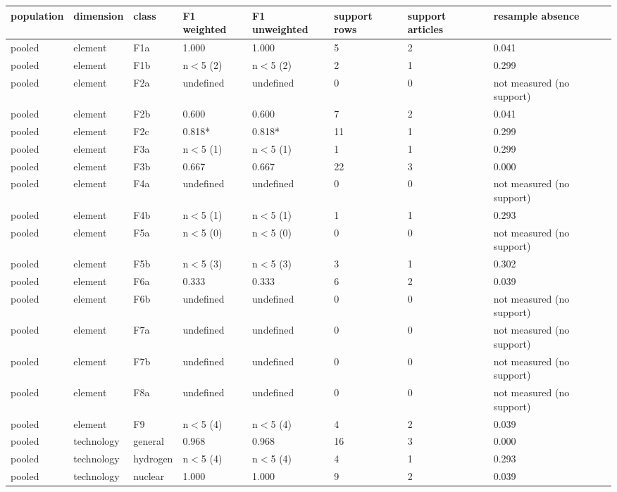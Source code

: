 \begin{table}[htbp]
\centering
\small
\begin{tabular}{llllllll}
\toprule
\textbf{population} & \textbf{dimension} & \textbf{class} & \textbf{F1 weighted} & \textbf{F1 unweighted} & \textbf{support rows} & \textbf{support articles} & \textbf{resample absence} \\
\midrule
pooled & element & F1a & 1.000 & 1.000 & 5 & 2 & 0.041 \\
pooled & element & F1b & n$<$5 (2) & n$<$5 (2) & 2 & 1 & 0.299 \\
pooled & element & F2a & undefined & undefined & 0 & 0 & not measured (no support) \\
pooled & element & F2b & 0.600 & 0.600 & 7 & 2 & 0.041 \\
pooled & element & F2c & 0.818* & 0.818* & 11 & 1 & 0.299 \\
pooled & element & F3a & n$<$5 (1) & n$<$5 (1) & 1 & 1 & 0.299 \\
pooled & element & F3b & 0.667 & 0.667 & 22 & 3 & 0.000 \\
pooled & element & F4a & undefined & undefined & 0 & 0 & not measured (no support) \\
pooled & element & F4b & n$<$5 (1) & n$<$5 (1) & 1 & 1 & 0.293 \\
pooled & element & F5a & n$<$5 (0) & n$<$5 (0) & 0 & 0 & not measured (no support) \\
pooled & element & F5b & n$<$5 (3) & n$<$5 (3) & 3 & 1 & 0.302 \\
pooled & element & F6a & 0.333 & 0.333 & 6 & 2 & 0.039 \\
pooled & element & F6b & undefined & undefined & 0 & 0 & not measured (no support) \\
pooled & element & F7a & undefined & undefined & 0 & 0 & not measured (no support) \\
pooled & element & F7b & undefined & undefined & 0 & 0 & not measured (no support) \\
pooled & element & F8a & undefined & undefined & 0 & 0 & not measured (no support) \\
pooled & element & F9 & n$<$5 (4) & n$<$5 (4) & 4 & 2 & 0.039 \\
pooled & technology & general & 0.968 & 0.968 & 16 & 3 & 0.000 \\
pooled & technology & hydrogen & n$<$5 (4) & n$<$5 (4) & 4 & 1 & 0.293 \\
pooled & technology & nuclear & 1.000 & 1.000 & 9 & 2 & 0.039 \\

\end{tabular}
\end{table}
